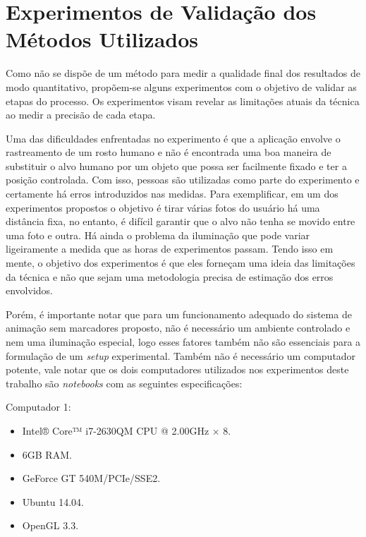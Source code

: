 

\section{Experimentos de Validação dos Métodos Utilizados}

Como não se dispõe de um método para medir a qualidade final dos resultados de
modo quantitativo, propõem-se alguns experimentos com o objetivo de validar as
etapas do processo. Os experimentos visam revelar as limitações atuais da
técnica ao medir a precisão de cada etapa.

Uma das dificuldades enfrentadas no experimento é que a aplicação envolve o
rastreamento de um rosto humano e não é encontrada uma boa maneira de substituir
o alvo humano por um objeto que possa ser facilmente fixado e ter a posição
controlada. Com isso, pessoas são utilizadas como parte do experimento e
certamente há erros introduzidos nas medidas. Para exemplificar, em um dos
experimentos propostos o objetivo é tirar várias fotos do usuário há uma
distância fixa, no entanto, é difícil garantir que o alvo não tenha se movido
entre uma foto e outra. Há ainda o problema da iluminação que pode variar
ligeiramente a medida que as horas de experimentos passam. Tendo isso em mente,
o objetivo dos experimentos é que eles forneçam uma ideia das limitações da
técnica e não que sejam uma metodologia precisa de estimação dos erros
envolvidos. 

Porém, é importante notar que para um funcionamento adequado do sistema de 
animação sem marcadores proposto, não é necessário um ambiente controlado e nem uma 
iluminação especial, logo esses fatores também não são essenciais para a formulação
de um \textit{setup} experimental. Também não é necessário um computador potente, vale notar
que os dois computadores utilizados nos experimentos deste trabalho são \textit{notebooks} com as seguintes especificações: 

Computador 1: 
\begin{itemize}
\item Intel® Core™ i7-2630QM CPU @ 2.00GHz × 8.
\item 6GB RAM.
\item GeForce GT 540M/PCIe/SSE2.
\item Ubuntu 14.04.
\item OpenGL 3.3.
\end{itemize}

